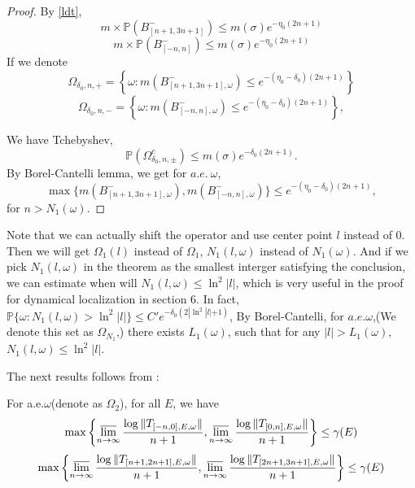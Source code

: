 \begin{proof}
  By \eqref{ldt},
\[
m\times\mathbb{P}(B_{[n+1,3n+1]}^-)\leq m(\sigma)e^{-\eta_0(2n+1)}
\]
\[
m\times\mathbb{P}(B_{[-n,n]}^-)\leq m(\sigma)e^{-\eta_0(2n+1)}
\]
  If we denote
    \[
      \Omega_{\delta_0,n,+}=\left\{\omega:m(B_{[n+1,3n+1],\omega}^-)\leq e^{-(\eta_0-\delta_0)(2n+1)}\right\}
    \]
    \[
    \Omega_{\delta_0,n,-}=\left\{\omega:m(B_{[-n,n],\omega}^-)\leq e^{-(\eta_0-\delta_0)(2n+1)}\right\},
    \]

  We have Tchebyshev,
  \[
      \mathbb{P}(\Omega_{\delta_0,n,\pm}^c)
      \leq m(\sigma)e^{-\delta_0(2n+1)}.
  \]
By Borel-Cantelli lemma, we get for $a.e.~\omega$,
\[
\max\{m(B_{[n+1,3n+1],\omega}^-),m(B_{[-n,n],\omega}^-)\}\leq e^{-(\eta_0-\delta_0)(2n+1)},
\]
for $n>N_1(\omega)$.
\end{proof}
\begin{remark}\label{N1}
  Note that we can actually shift the operator and use center point $l$ instead of $0$. Then we will get $\Omega_1(l)$ instead of $\Omega_1$, $N_1(l,\omega)$ instead of $N_1(\omega)$. And if we pick $N_1(l,\omega)$ in the theorem as the smallest interger satisfying the conclusion, we can estimate when will $N_1(l,\omega)\leq \ln^2 |l|$, which is very useful in the proof for dynamical localization in section 6.
  In fact, $\mathbb{P}\{\omega: N_1(l,\omega)>\ln^2 |l|\}\leq C' e^{-\delta_0(2|\ln^2|l|+1)}$, By Borel-Cantelli, for $a.e.\omega$,(We denote this set as $\Omega_{N_1}$,) there exists $L_1(\omega)$, such that for any $|l|>L_1(\omega)$, $N_1(l,\omega)\leq \ln^2|l|$.
\end{remark}
The next results follows from \cite{craig1983subharmonicity}:
\begin{thm}\label{CS}
  For a.e.$\omega$(denote as $\Omega_2$), for all $E$, we have
  \begin{equation}\label{C}
      \max\left\{\varlimsup_{n\to\infty} \frac{ \log\Vert T_{[-n,0],E,\omega}\Vert}{n+1}, \varlimsup_{n\to\infty} \frac{\log\Vert T_{[0,n],E,\omega}\Vert}{n+1}\right\}\leq\gamma(E)
  \end{equation}
  \begin{equation}\label{D}
    \max\left\{\varlimsup_{n\to\infty} \frac{\log\Vert T_{[n+1,2n+1],E,\omega}\Vert}{n+1}, \varlimsup_{n\to\infty} \frac{\log\Vert T_{[2n+1,3n+1],E,\omega}\Vert}{n+1}\right\}\leq\gamma(E)
  \end{equation}
\end{thm}
